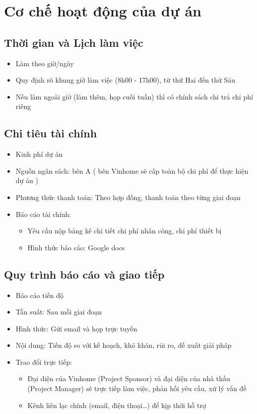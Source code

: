 \section{Cơ chế hoạt động của dự án}
\subsection{Thời gian và Lịch làm việc}
\begin{itemize}
    \item Làm theo giờ/ngày
    \item Quy định rõ khung giờ làm việc (8h00 - 17h00), từ thứ Hai đến thứ Sáu
    \item Nếu làm ngoài giờ (làm thêm, họp cuối tuần) thì có chính sách chi trả chi phí riêng
\end{itemize}
\subsection{Chi tiêu tài chính}
\begin{itemize}
    \item Kinh phí dự án
    \item Nguồn ngân sách: bên A ( bên Vinhome sẽ cấp toàn bộ chi phí để thực hiện dự án )
    \item Phương thức thanh toán: Theo hợp đồng, thanh toán theo từng giai đoạn
    \item Báo cáo tài chính:
    \begin{itemize}
        \item Yêu cầu nộp bảng kê chi tiết chi phí nhân công, chi phí thiết bị
        \item Hình thức báo cáo: Google docs
    \end{itemize}
\end{itemize}
\subsection{Quy trình báo cáo và giao tiếp}
\begin{itemize}
    \item Báo cáo tiến độ
    \item Tần suất: Sau mỗi giai đoạn
    \item Hình thức: Gửi email và họp trực tuyến
    \item Nội dung: Tiến độ so với kế hoạch, khó khăn, rủi ro, đề xuất giải pháp
    \item Trao đổi trực tiếp:
    \begin{itemize}
        \item Đại diện của Vinhome (Project Sponsor) và đại diện của nhà thầu (Project Manager) sẽ trực tiếp làm việc, phản hồi yêu cầu, xử lý vấn đề
        \item Kênh liên lạc chính (email, điện thoại…) để kịp thời hỗ trợ
    \end{itemize}
\end{itemize}
